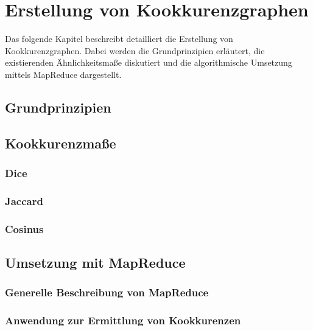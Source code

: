 \chapter{Erstellung von Kookkurenzgraphen}

Das folgende Kapitel beschreibt detailliert die Erstellung von Kookkurenzgraphen. Dabei werden die Grundprinzipien erläutert, die existierenden Ähnlichkeitsmaße diskutiert und die algorithmische Umsetzung mittels MapReduce dargestellt.

\section{Grundprinzipien}


\section{Kookkurenzmaße}

\subsection{Dice}

\subsection{Jaccard}

\subsection{Cosinus}

\section{Umsetzung mit MapReduce}

\subsection{Generelle Beschreibung von MapReduce}

\subsection{Anwendung zur Ermittlung von Kookkurenzen}